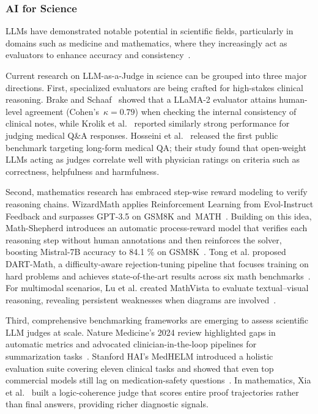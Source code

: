 \subsubsection{\textbf{AI for Science}}

LLMs have demonstrated notable potential in scientific fields, particularly in domains such as medicine and mathematics, where they increasingly act as evaluators to enhance accuracy and consistency~\cite{inno_infectious_diseases_zhou2024harnessing,inno_medicine_tang2024llms,inno_aigeo_zhao2024artificial}.  

Current research on LLM-as-a-Judge in science can be grouped into three major directions. First, specialized evaluators are being crafted for high-stakes clinical reasoning. Brake and Schaaf~\cite{brake2024comparing} showed that a LLaMA-2 evaluator attains human-level agreement (Cohen’s~$\kappa\!=\!0.79$) when checking the internal consistency of clinical notes, while Krolik et al.~\cite{krolik2024towards} reported similarly strong performance for judging medical Q\&A responses. Hosseini et al.~\cite{hosseini2024longform} released the first public benchmark targeting long-form medical QA; their study found that open-weight LLMs acting as judges correlate well with physician ratings on criteria such as correctness, helpfulness and harmfulness.

Second, mathematics research has embraced step-wise reward modeling to verify reasoning chains. WizardMath applies Reinforcement Learning from Evol-Instruct Feedback and surpasses GPT-3.5 on GSM8K and~MATH~\cite{wizardmath2023}. Building on this idea, Math-Shepherd introduces an automatic process-reward model that verifies each reasoning step without human annotations and then reinforces the solver, boosting Mistral-7B accuracy to 84.1 \% on GSM8K~\cite{wang2023mathshepherd}. Tong et al. proposed DART-Math, a difficulty-aware rejection-tuning pipeline that focuses training on hard problems and achieves state-of-the-art results across six math benchmarks~\cite{tong2024dart}. For multimodal scenarios, Lu et al. created MathVista to evaluate textual–visual reasoning, revealing persistent weaknesses when diagrams are involved~\cite{lu2023mathvista}.

Third, comprehensive benchmarking frameworks are emerging to assess scientific LLM judges at scale. Nature Medicine’s 2024 review highlighted gaps in automatic metrics and advocated clinician-in-the-loop pipelines for summarization tasks~\cite{naturemed2024summ}. Stanford HAI’s MedHELM introduced a holistic evaluation suite covering eleven clinical tasks and showed that even top commercial models still lag on medication-safety questions~\cite{medhelm2024}. In mathematics, Xia et al.~\cite{xia2024logicjudge} built a logic-coherence judge that scores entire proof trajectories rather than final answers, providing richer diagnostic signals.

